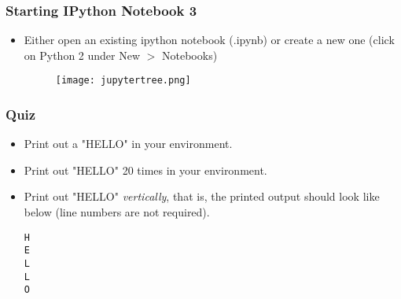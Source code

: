 \documentclass{beamer}
\begin{document}
\begin{frame}[fragile]
\frametitle{Starting IPython Notebook 3}
\begin{itemize}
\item Either open an existing ipython notebook (.ipynb)
    or create a new one (click on Python 2 under New $>$ Notebooks)
\begin{figure}[h]
  \texttt{[image: jupytertree.png]}
\end{figure}
\end{itemize}
\end{frame}

\begin{frame}[fragile]
\frametitle{Quiz}
\begin{itemize}
\item Print out a "HELLO" in your environment.
\item Print out "HELLO" 20 times in your environment.
\item Print out "HELLO" \emph{vertically}, that is, the printed
output should look like below (line numbers are not required).
\begin{lstlisting}
H
E
L
L
O
\end{lstlisting} 
\end{itemize}
\end{frame}

%   
%   
 
\end{document}
